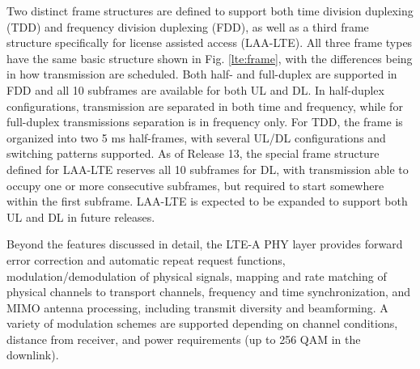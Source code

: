 Two distinct frame structures are defined to support both time division duplexing (TDD) and frequency division duplexing (FDD), as well as a third frame structure specifically for license assisted access (LAA-LTE).  All three frame types have the same basic structure shown in Fig. \ref{lte:frame}, with the differences being in how transmission are scheduled.  Both half- and full-duplex are supported in FDD and all 10 subframes are available for both UL and DL.  In half-duplex configurations, transmission are separated in both time and frequency, while for full-duplex transmissions separation is in frequency only.  For TDD, the frame is organized into two 5 ms half-frames, with several UL/DL configurations and switching patterns supported.  As of Release 13, the special frame structure defined for LAA-LTE reserves all 10 subframes for DL, with transmission able to occupy one or more consecutive subframes, but required to start somewhere within the first subframe. LAA-LTE is expected to be expanded to support both UL and DL in future releases.

Beyond the features discussed in detail, the LTE-A PHY layer provides forward error correction and automatic repeat request functions, modulation/demodulation of physical signals, mapping and rate matching of physical channels to transport channels, frequency and time synchronization, and MIMO antenna processing, including transmit diversity and beamforming.  A variety of modulation schemes are supported depending on channel conditions, distance from receiver, and power requirements (up to 256 QAM in the downlink).  

